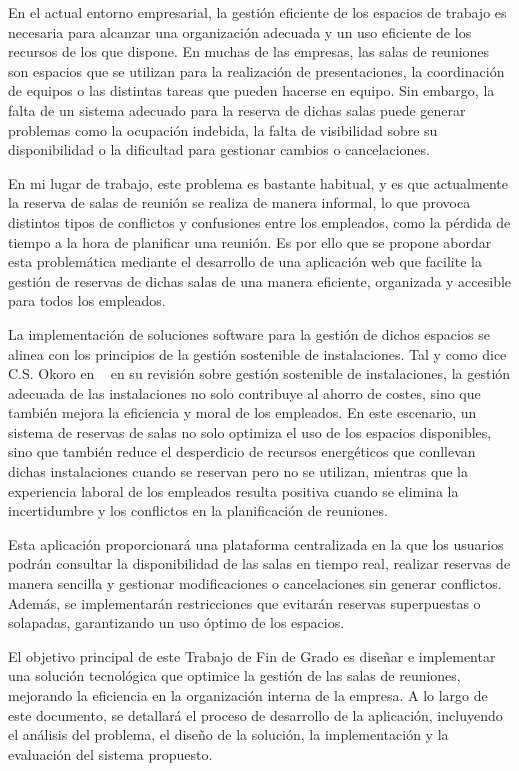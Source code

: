 
En el actual entorno empresarial, la gestión eficiente de los espacios de trabajo es necesaria para alcanzar una organización adecuada y un uso eficiente de los recursos de los que dispone. En muchas de las empresas, las salas de reuniones son espacios que se utilizan para la realización de presentaciones, la coordinación de equipos o las distintas tareas que pueden hacerse en equipo. Sin embargo, la falta de un sistema adecuado para la reserva de dichas salas puede generar problemas como la ocupación indebida, la falta de visibilidad sobre su disponibilidad o la dificultad para gestionar cambios o cancelaciones.

En mi lugar de trabajo, este problema es bastante habitual, y es que actualmente la reserva de salas de reunión se realiza de manera informal, lo que provoca distintos tipos de conflictos y confusiones entre los empleados, como la pérdida de tiempo a la hora de planificar una reunión. Es por ello que se propone abordar esta problemática mediante el desarrollo de una aplicación web que facilite la gestión de reservas de dichas salas de una manera eficiente, organizada y accesible para todos los empleados.

La implementación de soluciones software para la gestión de dichos espacios se alinea con los principios de la gestión sostenible de instalaciones. Tal y como dice C.S. Okoro en ~\cite{su15043174} en su revisión sobre gestión sostenible de instalaciones, la gestión adecuada de las instalaciones no solo contribuye al ahorro de costes, sino que también mejora la eficiencia y moral de los empleados. En este escenario, un sistema de reservas de salas no solo optimiza el uso de los espacios disponibles, sino que también reduce el desperdicio de recursos energéticos que conllevan dichas instalaciones cuando se reservan pero no se utilizan, mientras que la experiencia laboral de los empleados resulta positiva cuando se elimina la incertidumbre y los conflictos en la planificación de reuniones.

Esta aplicación proporcionará una plataforma centralizada en la que los usuarios podrán consultar la disponibilidad de las salas en tiempo real, realizar reservas de manera sencilla y gestionar modificaciones o cancelaciones sin generar conflictos. Además, se implementarán restricciones que evitarán reservas superpuestas o solapadas, garantizando un uso óptimo de los espacios.

El objetivo principal de este Trabajo de Fin de Grado es diseñar e implementar una solución tecnológica que optimice la gestión de las salas de reuniones, mejorando la eficiencia en la organización interna de la empresa. A lo largo de este documento, se detallará el proceso de desarrollo de la aplicación, incluyendo el análisis del problema, el diseño de la solución, la implementación y la evaluación del sistema propuesto.

